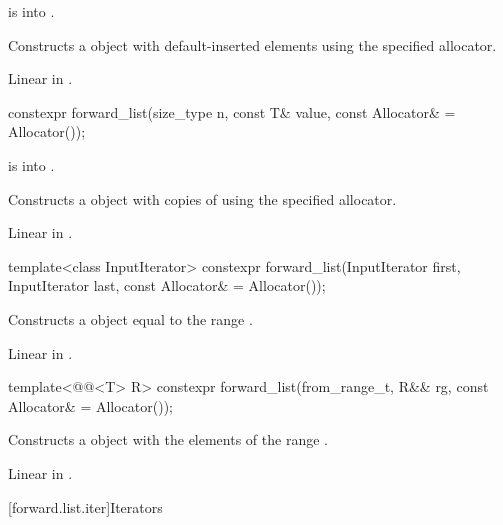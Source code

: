 \begin{itemdescr}
\pnum
\expects
{} is  into .

\pnum
\effects
Constructs a  object with 
default-inserted elements using the specified allocator.

\pnum
\complexity
Linear in .
\end{itemdescr}

%
\begin{itemdecl}
constexpr forward_list(size_type n, const T& value, const Allocator& = Allocator());
\end{itemdecl}

\begin{itemdescr}
\pnum
\expects
{} is  into .

\pnum
\effects
Constructs a  object with  copies of  using the specified allocator.

\pnum
\complexity
Linear in .
\end{itemdescr}

%
\begin{itemdecl}
template<class InputIterator>
  constexpr forward_list(InputIterator first, InputIterator last, const Allocator& = Allocator());
\end{itemdecl}

\begin{itemdescr}
\pnum
\effects
Constructs a  object equal to the range .

\pnum
\complexity
Linear in .
\end{itemdescr}

%
\begin{itemdecl}
template<@@<T> R>
  constexpr forward_list(from_range_t, R&& rg, const Allocator& = Allocator());
\end{itemdecl}

\begin{itemdescr}
\pnum
\effects
Constructs a  object
with the elements of the range .

\pnum
\complexity
Linear in .
\end{itemdescr}

[forward.list.iter]{Iterators}

